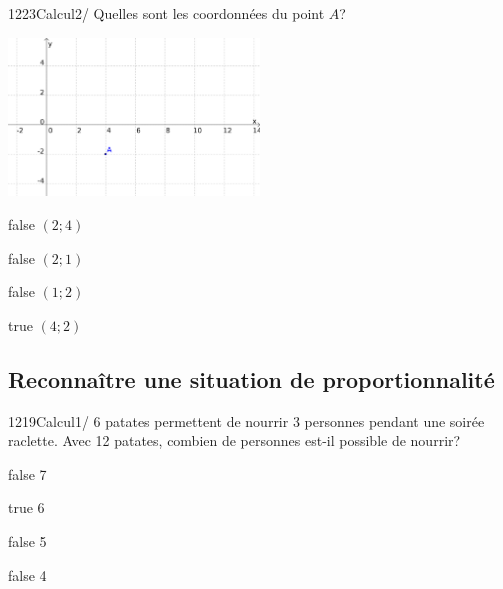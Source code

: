 \documentclass[11pt]{article}
\begin{document}
            \begin{question}{1223}{Calcul}{2}{/}
                Quelles sont les coordonnées du point $A$?\\
                \begin{center}
                	\includegraphics[width=0.5\textwidth]{Philippe/Figures_Philippe/calcul_6_5.png}
                \end{center}
            \end{question}

            \begin{reponses}
                \item[false] $(2;4)$
                \item[false] $(2;1)$
                \item[false] $(1;2)$
                \item[true] $(4;2)$
            \end{reponses}
            
        \subsection{Reconnaître une situation de proportionnalité}
        	
            \begin{question}{1219}{Calcul}{1}{/}
            	6 patates permettent de nourrir 3 personnes pendant une soirée raclette. Avec 12 patates, combien de personnes est-il possible de nourrir?
            \end{question}

            \begin{reponses}
            	\item[false] 7
            	\item[true] 6
                \item[false] 5
                \item[false] 4
            \end{reponses}
        	
\end{document}
